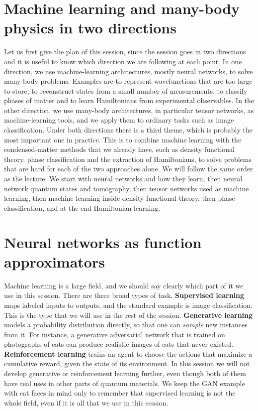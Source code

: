 \section{Machine learning and many-body physics in two directions}

Let us first give the plan of this session, since the session goes in two directions and it is
useful to know which direction we are following at each point. In one direction, we use
machine-learning architectures, mostly neural networks, to solve many-body problems. Examples are
to represent wavefunctions that are too large to store, to reconstruct states from a small number
of measurements, to classify phases of matter and to learn Hamiltonians from experimental
observables. In the other direction, we use many-body architectures, in particular tensor
networks, as machine-learning tools, and we apply them to ordinary tasks such as image
classification. Under both directions there is a third theme, which is probably the most important
one in practice. This is to combine machine learning with the condensed-matter methods that we
already have, such as density functional theory, phase classification and the extraction of
Hamiltonians, to solve problems that are hard for each of the two approaches alone. We will follow
the same order as the lecture. We start with neural networks and how they learn, then neural
network quantum states and tomography, then tensor networks used as machine learning, then machine
learning inside density functional theory, then phase classification, and at the end Hamiltonian
learning.

\section{Neural networks as function approximators}

Machine learning is a large field, and we should say clearly which part of it we use in this
session. There are three broad types of task. \textbf{Supervised learning} maps labeled inputs to
outputs, and the standard example is image classification. This is the type that we will use in
the rest of the session. \textbf{Generative learning} models a probability distribution directly,
so that one can \emph{sample} new instances from it. For instance, a generative adversarial network
that is trained on photographs of cats can produce realistic images of cats that never existed.
\textbf{Reinforcement learning} trains an agent to choose the actions that maximize a cumulative
reward, given the state of its environment. In this session we will not develop generative or
reinforcement learning further, even though both of them have real uses in other parts of quantum
materials. We keep the GAN example with cat faces in mind only to remember that supervised learning
is not the whole field, even if it is all that we use in this session.

